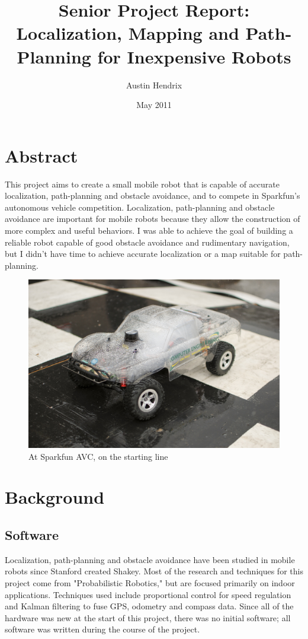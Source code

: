 \documentclass[a4paper,12pt]{article}
\begin{document}
\title{Senior Project Report: Localization, Mapping and Path-Planning for Inexpensive Robots}
\author{Austin Hendrix}
\date{May 2011}
\maketitle

\section{Abstract}
This project aims to create a small mobile robot that is capable of accurate localization, path-planning and obstacle avoidance, and to compete in Sparkfun's autonomous vehicle competition\cite{avc}. Localization, path-planning and obstacle avoidance are important for mobile robots because they allow the construction of more complex and useful behaviors. I was able to achieve the goal of building a reliable robot capable of good obstacle avoidance and rudimentary navigation, but I didn't have time to achieve accurate localization or a map suitable for path-planning.

\begin{figure}[h]
\includegraphics[width=1.00\textwidth]{start}
\caption{At Sparkfun AVC, on the starting line}
\end{figure}

\section{Background}
\subsection{Software}
Localization, path-planning and obstacle avoidance have been studied in mobile robots since Stanford created Shakey\cite{shakey}. Most of the research and techniques for this project come from "Probabilistic Robotics,"\cite{thrun} but are focused primarily on indoor applications. Techniques used include proportional control for speed regulation and Kalman filtering to fuse GPS, odometry and compass data. Since all of the hardware was new at the start of this project, there was no initial software; all software was written during the course of the project.
\end{document}
